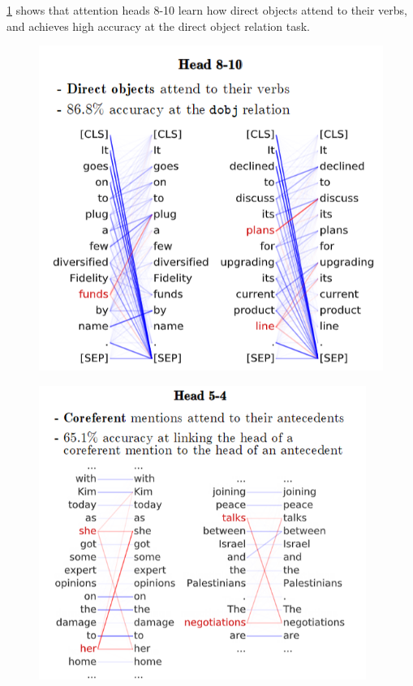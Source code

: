 \cref{fig:bertHeadDirectObject} shows that attention heads 8-10 learn how direct objects attend to their verbs, and achieves high accuracy at the direct object relation task.





\begin{figure}
\centering
\begin{minipage}{.4\textwidth}
  \centering
  \includegraphics[width=.95\textwidth]{imgs/bert_headsDirectObject.png}
  \label{fig:bertHeadDirectObject}
\end{minipage} \hspace{2em}%
\begin{minipage}{.4\textwidth}
  \centering
  \includegraphics[width=0.95\textwidth]{imgs/bert_headsCoref.png}

\end{minipage}
\end{figure}
